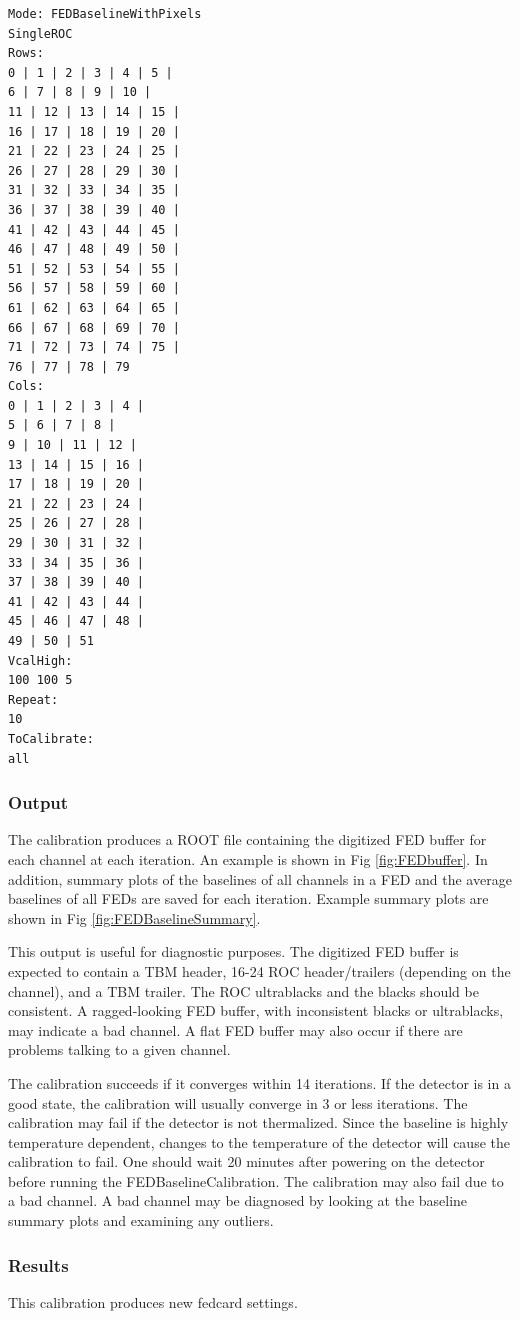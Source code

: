 \begin{verbatim}
Mode: FEDBaselineWithPixels
SingleROC
Rows:
0 | 1 | 2 | 3 | 4 | 5 |
6 | 7 | 8 | 9 | 10 |
11 | 12 | 13 | 14 | 15 |
16 | 17 | 18 | 19 | 20 |
21 | 22 | 23 | 24 | 25 |
26 | 27 | 28 | 29 | 30 |
31 | 32 | 33 | 34 | 35 |
36 | 37 | 38 | 39 | 40 |
41 | 42 | 43 | 44 | 45 |
46 | 47 | 48 | 49 | 50 |
51 | 52 | 53 | 54 | 55 |
56 | 57 | 58 | 59 | 60 |
61 | 62 | 63 | 64 | 65 |
66 | 67 | 68 | 69 | 70 |
71 | 72 | 73 | 74 | 75 |
76 | 77 | 78 | 79
Cols:
0 | 1 | 2 | 3 | 4 |
5 | 6 | 7 | 8 |
9 | 10 | 11 | 12 |
13 | 14 | 15 | 16 |
17 | 18 | 19 | 20 |
21 | 22 | 23 | 24 |
25 | 26 | 27 | 28 |
29 | 30 | 31 | 32 |
33 | 34 | 35 | 36 |
37 | 38 | 39 | 40 |
41 | 42 | 43 | 44 |
45 | 46 | 47 | 48 |
49 | 50 | 51
VcalHigh:
100 100 5
Repeat:
10
ToCalibrate:
all
\end{verbatim}

\subsubsection{Output}
The calibration produces a ROOT file containing the digitized FED buffer for each channel at each iteration. An example is shown in Fig \ref{fig:FEDbuffer}.  In addition, summary plots of the baselines of all channels in a FED and the average baselines of all FEDs are saved for each iteration. Example summary plots are shown in Fig \ref{fig:FEDBaselineSummary}.

This output is useful for diagnostic purposes. The digitized FED buffer is expected to contain a TBM header, 16-24 ROC header/trailers (depending on the channel), and a TBM trailer.  The ROC ultrablacks and the blacks should be consistent.  A ragged-looking FED buffer, with inconsistent blacks or ultrablacks, may indicate a bad channel.  A flat FED buffer may also occur if there are problems talking to a given channel.

The calibration succeeds if it converges within 14 iterations.  If the detector is in a good state, the calibration will usually converge in 3 or less iterations.  The calibration may fail if the detector is not thermalized.  Since the baseline is highly temperature dependent, changes to the temperature of the detector will cause the calibration to fail. One should wait 20 minutes after powering on the detector before running the FEDBaselineCalibration.  The calibration may also fail due to a bad channel.  A bad channel may be diagnosed by looking at the baseline summary plots and examining any outliers.  

\subsubsection{Results}
This calibration produces new fedcard settings.

